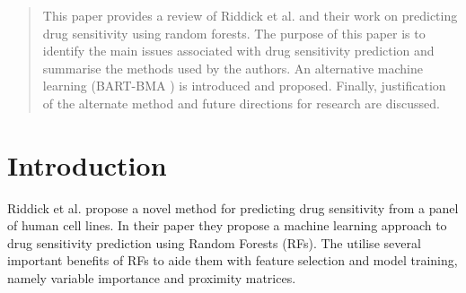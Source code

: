 \documentclass[journal]{IEEEtran}
\begin{document}




\maketitle









%
\IEEEpeerreviewmaketitle

\begin{abstract}
	This paper provides a review of Riddick et al. \cite{riddick2011predicting} and their work on predicting drug sensitivity using random forests. The purpose of this paper is to identify the main issues associated with drug sensitivity prediction and summarise the methods used by the authors. An alternative machine learning (BART-BMA \cite{hernandez2015bayesian}) is introduced and proposed. Finally, justification of the alternate method and future directions for research are discussed.
\end{abstract}

\section{Introduction}
Riddick et al. \cite{riddick2011predicting} propose a novel method for predicting drug sensitivity from a panel of human cell lines. In their paper they propose a machine learning approach to drug sensitivity prediction using Random Forests (RFs). The utilise several important benefits of RFs to aide them with feature selection and model training, namely variable importance and proximity matrices. 
\end{document}
